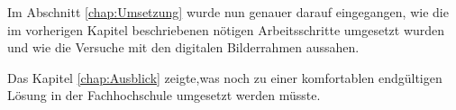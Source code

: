 \begin{flushleft}
\newpage
Im Abschnitt \ref{chap:Umsetzung} wurde nun genauer darauf eingegangen, wie die im vorherigen Kapitel beschriebenen nötigen Arbeitsschritte umgesetzt wurden und wie die Versuche mit den digitalen Bilderrahmen aussahen.
\newline


Das Kapitel \ref{chap:Ausblick} zeigte,was noch zu einer komfortablen endgültigen Lösung in der Fachhochschule umgesetzt werden müsste.
\end{flushleft}



